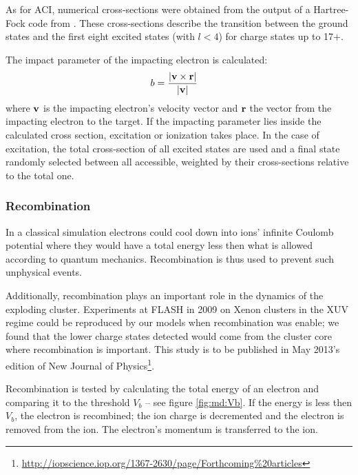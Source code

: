 As for ACI, numerical cross-sections were obtained from the output of a
Hartree-Fock code from \cite{CowanCode}. These cross-sections describe the
transition between the ground states and the first eight excited states (with
$l<4$) for charge states up to 17+.

The impact parameter of the impacting electron is calculated:
\begin{align}
b & = \frac{\left| \textbf{v} \times \textbf{r} \right|}{\left| \textbf{v} \right|}
\label{eqn:ionization:impact:parameter}
\end{align}
where $\textbf{v}$ is the impacting electron's velocity vector and $\textbf{r}$ the vector
from the impacting electron to the target. If the impacting parameter lies
inside the calculated cross section, excitation or ionization takes place. In
the case of excitation, the total cross-section of all excited states are used
and a final state randomly selected between all accessible, weighted by their
cross-sections relative to the total one.



\subsubsection{Recombination}
In a classical simulation electrons could cool down into ions' infinite Coulomb
potential where they would have a total energy less then what is allowed
according to quantum mechanics. Recombination is thus used to prevent such
unphysical events.

Additionally, recombination plays an important role in the dynamics of the
exploding cluster. Experiments at FLASH in 2009 on Xenon clusters in the XUV
regime\cite{Thomas2009} could be reproduced by our models when recombination
was enable; we found that the lower charge states detected would come from the
cluster core where recombination is important. This study is to be published in
May 2013's edition of New Journal of
Physics\footnote{\url{http://iopscience.iop.org/1367-2630/page/Forthcoming\%20articles}}.

Recombination is tested by calculating the total energy of an electron and
comparing it to the threshold $V_b$ -- see figure \ref{fig:md:Vb}. If
the energy is less then $V_b$, the electron is recombined; the ion charge is
decremented and the electron is removed from the ion. The electron's momentum
is transferred to the ion.

